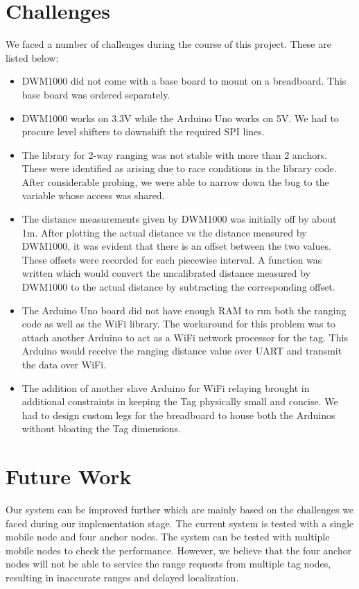 \documentclass[journal,transmag]{IEEEtran}
\begin{document}
\section{Challenges}
We faced a number of challenges during the course of this project.  These are listed below: 

\begin{itemize}
\item DWM1000 did not come with a base board to mount on a breadboard. This base board was ordered separately.
\item DWM1000 works on 3.3V while the Arduino Uno works on 5V. We had to procure level shifters to downshift the required SPI lines.
\item The library for 2-way ranging was not stable with more than 2 anchors. These were identified as arising due to race conditions in the library code. After considerable probing, we were able to narrow down the bug to the variable whose access was shared.
\item The distance measurements given by DWM1000 was initially off by about 1m. After plotting the actual distance vs the distance measured by DWM1000, it was evident that there is an offset between the two values. These offsets were recorded for each piecewise interval. A function was written which would convert the uncalibrated distance measured by DWM1000 to the actual distance by subtracting the corresponding offset.
\item The Arduino Uno board did not have enough RAM to run both the ranging code as well as the WiFi library. The workaround for this problem was to attach another Arduino to act as a WiFi network processor for the tag. This Arduino would receive the ranging distance value over UART and transmit the data over WiFi.
\item The addition of another slave Arduino for WiFi relaying brought in additional constraints in keeping the Tag physically small and concise. We had to design custom legs for the breadboard to house both the Arduinos without bloating the Tag dimensions.
\end{itemize}
\section{Future Work}
Our system can be improved further which are mainly based on the challenges we faced during our implementation stage. 
The current system is tested with a single mobile node and four anchor nodes. The system can be tested with multiple mobile nodes to check the performance. However, we believe that the four anchor nodes will not be able to service the range requests from multiple tag nodes, resulting in inaccurate ranges and delayed localization. \\
\end{document}
